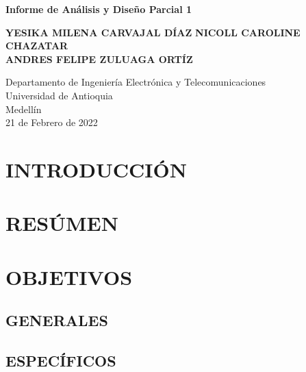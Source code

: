 \documentclass{article}
\begin{document}
\begin{titlepage}
    \begin{center}
        \vspace*{1cm}
            
        \Huge
        \textbf{Informe de Análisis y Diseño Parcial 1}
            
        \vspace{0.5cm}
        \LARGE
            
        \vspace{1.5cm}
            
        \textbf{YESIKA MILENA CARVAJAL DÍAZ}
        \textbf{NICOLL CAROLINE CHAZATAR}\\
        \textbf{ANDRES FELIPE ZULUAGA ORTÍZ}
            
        \vfill
            
        \vspace{0.8cm}
            
        \Large
        Departamento de Ingeniería Electrónica y Telecomunicaciones\\
        Universidad de Antioquia\\
        Medellín\\
        21 de Febrero de 2022
            
    \end{center}
\end{titlepage}

\tableofcontents
\newpage

\section{INTRODUCCIÓN}

\section{RESÚMEN}

\section{OBJETIVOS}

\subsection{GENERALES}

\subsection{ESPECÍFICOS}
\end{document}
